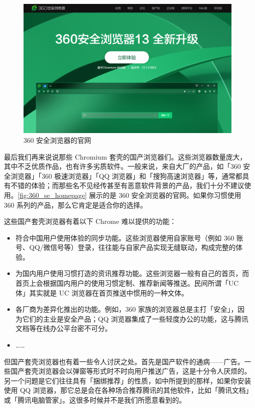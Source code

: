 \begin{figure}[htb!]
  \centering
  \includegraphics[width=.7\textwidth]{assets/software/360_se_homepage.png}
  \caption{360 安全浏览器的官网}
  \label{fig:360_se_homepage}
\end{figure}

最后我们再来说说那些 Chromium 套壳的国产浏览器们。这些浏览器数量庞大，其中不乏优质作品，也有许多劣质软件。一般来说，来自大厂的产品，如「360 安全浏览器」「360 极速浏览器」「QQ 浏览器」和「搜狗高速浏览器」等，通常都具有不错的体验；而那些名不见经传甚至有恶意软件背景的产品，我们十分不建议使用。\autoref{fig:360_se_homepage} 展示的是 360 安全浏览器的官网。如果你习惯使用 360 系列的产品，那么它肯定是适合你的选择。

这些国产套壳浏览器有着以下 Chrome 难以提供的功能：

\begin{itemize}
  \item 符合中国用户使用体验的同步功能。这些浏览器使用自家账号（例如 360 账号、QQ/微信号等）登录，往往能与自家产品实现无缝联动，构成完整的体验。
  \item 为国内用户使用习惯打造的资讯推荐功能。这些浏览器一般有自己的首页，而首页上会根据国内用户的使用习惯定制、推荐新闻等推送。民间所谓「UC 体」其实就是 UC 浏览器在首页推送中惯用的一种文体。
  \item 各厂商为差异化推出的功能。例如，360 家族的浏览器总是主打「安全」，因为它们的主业是安全产品；QQ 浏览器集成了一些轻度办公的功能，这与腾讯文档等在线办公平台密不可分。
  \item ……
\end{itemize}

但国产套壳浏览器也有着一些令人讨厌之处。首先是国产软件的通病——广告。一些国产套壳浏览器会以弹窗等形式时不时向用户推送广告，这是十分令人厌烦的。另一个问题是它们往往具有「捆绑推荐」的性质，如中所提到的那样，如果你安装使用 QQ 浏览器，那它总是会在各种场合推荐腾讯的其他软件，比如「腾讯文档」或「腾讯电脑管家」。这很多时候并不是我们所愿意看到的。

